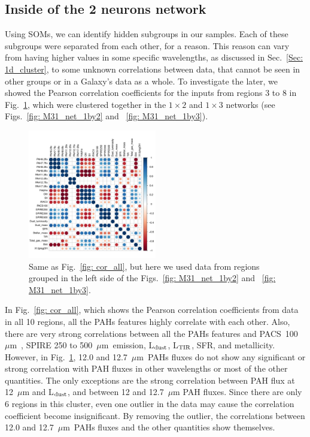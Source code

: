         
    \subsection{Inside of the 2 neurons network}%
        \label{sec: inside_the_2_neurons}
        Using SOMs, we can identify hidden subgroups in our samples. 
        Each of these subgroups were separated from each other, for a reason.
        This reason can vary from having higher values in some specific wavelengths, as discussed in Sec.~\ref{Sec: 1d_cluster}, to some unknown correlations between data, that cannot be seen in other groups or in a Galaxy's data as a whole.
        To investigate the later, we showed the Pearson correlation coefficients for the inputs from regions 3 to 8 in Fig.~\ref{fig: cor_cluster1}, which were clustered together in the $1\times2$ and $1\times3$ networks (see Figs.~\ref{fig: M31_net_1by2} and ~\ref{fig: M31_net_1by3}).
        
        \begin{figure}
        \includegraphics[width=0.5\textwidth]{../images0.01/cor_plots/M31_derived_3_to_8_core_plot_for_paper.pdf}%
        \caption{Same as Fig.~\ref{fig: cor_all}, but here we used data from regions grouped in the left side of the Figs.~\ref{fig: M31_net_1by2} and ~\ref{fig: M31_net_1by3}. }
          \label{fig: cor_cluster1}
        \end{figure}
        
        In Fig.~\ref{fig: cor_all}, which shows the Pearson correlation coefficients from data in all 10 regions, all the PAHs features highly correlate with each other. 
        Also, there are very strong correlations between all the PAHs features and PACS~100~$\mu$m~, SPIRE 250 to 500~$\mu$m~emission, L$_{\rm dust}$, L$_{\rm TIR}$, SFR, and metallicity.
        However, in Fig.~\ref{fig: cor_cluster1}, 12.0 and 12.7~$\mu$m~PAHs fluxes do not show any significant or strong correlation with PAH fluxes in other wavelengths or most of the other quantities.
        The only exceptions are the strong correlation between PAH flux at 12~$\mu$m and L$_{\rm dust}$, and between 12 and 12.7~$\mu$m PAH fluxes.
        Since there are only 6 regions in this cluster, even one outlier in the data may cause the correlation coefficient become insignificant.
        By removing the outlier, the correlations between 12.0 and 12.7~$\mu$m~PAHs fluxes and the other quantities show themselves. 
        

